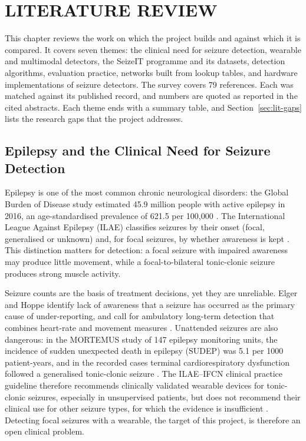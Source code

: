 \chapter{LITERATURE REVIEW}\label{ch:lit}

This chapter reviews the work on which the project builds and against which it is compared. It covers seven themes:
the clinical need for seizure detection, wearable and multimodal detectors, the SeizeIT programme and its datasets,
detection algorithms, evaluation practice, networks built from lookup tables, and hardware implementations of seizure
detectors. The survey covers 79 references. Each was matched against its published record, and numbers are quoted as
reported in the cited abstracts. Each theme ends with a summary table, and Section~\ref{sec:lit-gaps} lists the
research gaps that the project addresses.

\section{Epilepsy and the Clinical Need for Seizure Detection}\label{sec:lit-clinical}

Epilepsy is one of the most common chronic neurological disorders: the Global Burden of Disease study estimated 45.9
million people with active epilepsy in 2016, an age-standardised prevalence of 621.5 per 100,000
\cite{gbd2019epilepsy}. The International League Against Epilepsy (ILAE) classifies seizures by their onset (focal,
generalised or unknown) and, for focal seizures, by whether awareness is kept \cite{fisher2017ilae}. This distinction
matters for detection: a focal seizure with impaired awareness may produce little movement, while a focal-to-bilateral
tonic-clonic seizure produces strong muscle activity.

Seizure counts are the basis of treatment decisions, yet they are unreliable. Elger and Hoppe identify lack of
awareness that a seizure has occurred as the primary cause of under-reporting, and call for ambulatory long-term
detection that combines heart-rate and movement measures \cite{elger2018underreporting}. Unattended seizures are also
dangerous: in the MORTEMUS study of 147 epilepsy monitoring units, the incidence of sudden unexpected death in epilepsy
(SUDEP) was 5.1 per 1000 patient-years, and in the recorded cases terminal cardiorespiratory dysfunction followed a
generalised tonic-clonic seizure \cite{ryvlin2013mortemus}. The ILAE--IFCN clinical practice guideline therefore
recommends clinically validated wearable devices for tonic-clonic seizures, especially in unsupervised patients, but
does not recommend their clinical use for other seizure types, for which the evidence is insufficient
\cite{beniczky2021guideline}. Detecting focal seizures with a wearable, the target of this project, is therefore an
open clinical problem.

